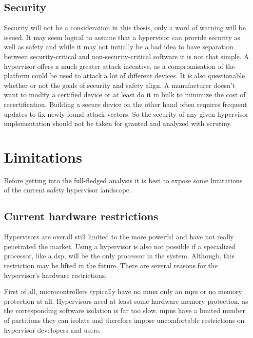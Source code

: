 \subsection{Security}
Security will not be a consideration in this thesis, only a word of warning will be issued. It may seem logical to assume that a hypervisor can provide security as well as safety and while it may not initially be a bad idea to have separation between security-critical and non-security-critical software it is not that simple. A hypervisor offers a much greater attack incentive, as a compromisation of the platform could be used to attack a lot of different devices. It is also questionable whether or not the goals of security and safety align. A manufacturer doesn't want to modify a certified device or at least do it in bulk to minimize the cost of recertification. Building a secure device on the other hand often requires frequent updates to fix newly found attack vectors. So the security of any given hypervisor implementation should not be taken for granted and analyzed with scrutiny.

\section{Limitations}
Before getting into the full-fledged analysis it is best to expose some limitations of the current safety hypervisor landscape. 
\subsection{Current hardware restrictions}
Hypervisors are overall still limited to the more powerful  and have not really penetrated the  market. Using a hypervisor is also not possible if a specialized processor, like a \acrfull{dsp}, will be the only processor in the system. Although, this restriction may be lifted in the future.  There are several reasons for the hypervisor's hardware restrictions. 

First of all, microcontrollers typically have no \acrshort{mmu} only an \acrshort{mpu} or no memory protection at all. Hypervisors need at least some hardware memory protection, as the corresponding software isolation is far too slow. \acrshort{mpu}s have a limited number of partitions they can isolate and therefore impose uncomfortable restrictions on hypervisor developers and users.

